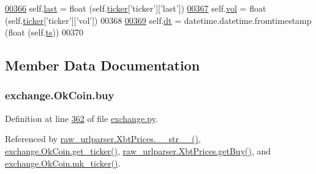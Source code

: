\begin{DoxyCode}
\hypertarget{classexchange_1_1_ok_coin.tex_l00366}{}\hyperlink{classexchange_1_1_ok_coin_a726afbe3a75835fdcbe523aed8d6763c}{00366}         self.\hyperlink{classexchange_1_1_ok_coin_a726afbe3a75835fdcbe523aed8d6763c}{last} = float (self.\hyperlink{classexchange_1_1_exchange_a7cf9e52f993627955a2e242c388daaeb}{ticker}[\textcolor{stringliteral}{'ticker'}][\textcolor{stringliteral}{'last'}])
\hypertarget{classexchange_1_1_ok_coin.tex_l00367}{}\hyperlink{classexchange_1_1_ok_coin_ad0e78d6b3c0a24504be72a0216fc6549}{00367}         self.\hyperlink{classexchange_1_1_ok_coin_ad0e78d6b3c0a24504be72a0216fc6549}{vol}  = float (self.\hyperlink{classexchange_1_1_exchange_a7cf9e52f993627955a2e242c388daaeb}{ticker}[\textcolor{stringliteral}{'ticker'}][\textcolor{stringliteral}{'vol'}])
00368     
\hypertarget{classexchange_1_1_ok_coin.tex_l00369}{}\hyperlink{classexchange_1_1_ok_coin_ade9d7cddcfa54f2b1ba5452854bfd48b}{00369}         self.\hyperlink{classexchange_1_1_ok_coin_ade9d7cddcfa54f2b1ba5452854bfd48b}{dt} = datetime.datetime.fromtimestamp (float (self.\hyperlink{classexchange_1_1_ok_coin_a0fe6263a7f58a6fa8a688929976b7e4a}{ts}))
00370     
\end{DoxyCode}


\subsection{Member Data Documentation}
\subsubsection[{\texorpdfstring{buy}{buy}}]{\setlength{\rightskip}{0pt plus 5cm}exchange.\+Ok\+Coin.\+buy}\hypertarget{classexchange_1_1_ok_coin_aaf828e37142a83cbfb12d193313f6d43}{}\label{classexchange_1_1_ok_coin_aaf828e37142a83cbfb12d193313f6d43}


Definition at line \hyperlink{exchange_8py_source_l00362}{362} of file \hyperlink{exchange_8py_source}{exchange.\+py}.



Referenced by \hyperlink{raw__urlparser_8py_source_l00074}{raw\+\_\+urlparser.\+Xbt\+Prices.\+\_\+\+\_\+str\+\_\+\+\_\+()}, \hyperlink{exchange_8py_source_l00371}{exchange.\+Ok\+Coin.\+get\+\_\+ticker()}, \hyperlink{raw__urlparser_8py_source_l00062}{raw\+\_\+urlparser.\+Xbt\+Prices.\+get\+Buy()}, and \hyperlink{exchange_8py_source_l00385}{exchange.\+Ok\+Coin.\+mk\+\_\+ticker()}.

